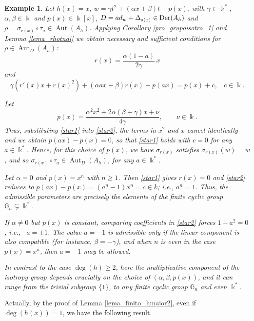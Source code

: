 \documentclass{article}
\numberwithin{equation}{section}\theoremstyle{plain}
\newtheorem{example}[theorem]{Example}
\newcommand{\der}{{\rm Der}}
\DeclareMathOperator{\Aut}{Aut}
\begin{document}
\begin{example}\label{example_w}
Let $h(x)=x$, $w=\gamma t^2 + (\alpha x+\beta)t + p(x)$, with $\gamma\in \Bbbk^*$, $\alpha,\beta\in \Bbbk$ and $p(x)\in \Bbbk[x]$, $D=ad_w+\Delta_{s(x)} \in \der(A_h)$ and $\rho=\sigma_{r(x)}\circ\tau_a\in \Aut(A_h)$.
Applying Corollary \ref{pro_grupoisotro_1} and Lemma \ref{lema_rhotnai} we obtain necessary and sufficient
conditions for $\rho\in \Aut_D(A_h)$:
\begin{equation}\label{star1}
r(x)=\dfrac{\alpha(1-a)}{2\gamma} \, x
\end{equation}
and
\begin{equation}\label{star2}
\gamma(r'(x)x+r(x)^2)+(\alpha a x+\beta)r(x)+p(ax)=p(x)+c, \ \ \ \  c\in \Bbbk.
\end{equation}

Let
\[
p(x)=\frac{\alpha^2 x^2 + 2\alpha(\beta+\gamma)x + \nu}{4\gamma},\qquad \nu\in \Bbbk.
\]
Thus, substituting \eqref{star1} into \eqref{star2}, the terms in
$x^2$ and $x$ cancel identically and we obtain $p(ax)-p(x)=0$, so that
\eqref{star1} holds with $c=0$ for any $a\in \Bbbk^*$.
Hence, for this choice of $p(x)$, we have $\sigma_{r(x)}$ satisfies $\sigma_{r(x)}(w)=w$, and so $\sigma_{r(x)} \circ \tau_a \in \Aut_{D}(A_h)$, for any $a \in \Bbbk^*$.

Let $\alpha=0$ and $p(x)=x^n$ with $n\geq 1$. Then \eqref{star1} gives
$r(x)=0$ and \eqref{star2} reduces to $p(ax)-p(x)=(a^n-1)x^n = c\in k$; \emph{i.e.}, $a^n=1$.
Thus, the admissible parameters are precisely the elements of the finite cyclic group $
 \mathbb{G}_n \subsetneq \Bbbk^*$.

If $\alpha\neq0$ but $p(x)$ is constant, comparing coefficients in
\eqref{star2} forces $1-a^2=0$, \emph{i.e.}, \ $a=\pm1$. The value $a=-1$ is admissible
only if the linear component is also compatible (for instance, $\beta=-\gamma$), and when $n$ is even in the case $p(x)=x^n$, then $a=-1$
may be allowed. 


In contrast to the case $\deg (h) \ge 2$, here the multiplicative component of the isotropy group depends crucially on the choice of $(\alpha,\beta,p(x))$, and it can range from the trivial subgroup $\{1\}$, to any finite cyclic group $\mathbb{G}_n$ and even $\Bbbk^*$.


    
\end{example}


\medbreak

Actually, by the proof of Lemma \ref{lema_finito_hmaior2}, even if $\deg(h(x))=1$, we have the following result. 
\end{document}
